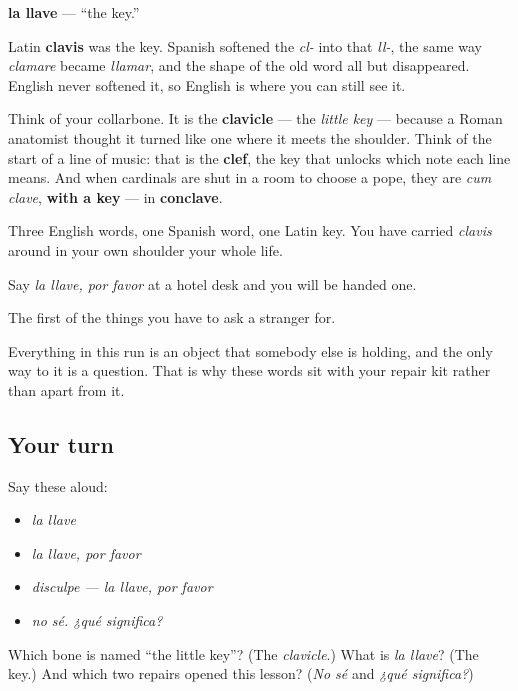 \begin{cousinweb}
\textbf{la llave} — \textquotedblleft{}the key.\textquotedblright{}

Latin \textbf{clavis} was the key. Spanish softened the \emph{cl-} into that \emph{ll-}, the same way \emph{clamare} became \emph{llamar}, and the shape of the old word all but disappeared. English never softened it, so English is where you can still see it.

Think of your collarbone. It is the \textbf{clavicle} — the \emph{little key} — because a Roman anatomist thought it turned like one where it meets the shoulder. Think of the start of a line of music: that is the \textbf{clef}, the key that unlocks which note each line means. And when cardinals are shut in a room to choose a pope, they are \emph{cum clave}, \textbf{with a key} — in \textbf{conclave}.

Three English words, one Spanish word, one Latin key. You have carried \emph{clavis} around in your own shoulder your whole life.

Say \emph{la llave, por favor} at a hotel desk and you will be handed one.
\end{cousinweb}

\begin{grammarlens}[title={What you've built}]
The first of the things you have to ask a stranger for.

Everything in this run is an object that somebody else is holding, and the only way to it is a question. That is why these words sit with your repair kit rather than apart from it.
\end{grammarlens}

\subsection*{Your turn}
Say these aloud:

\begin{itemize}
\raggedright
  \item \emph{la llave}
  \item \emph{la llave, por favor}
  \item \emph{disculpe — la llave, por favor}
  \item \emph{no sé. ¿qué significa?}
\end{itemize}

\begin{tcolorbox}[breakable,colback=teal!4,colframe=teal!35!black,title={Before you move on}]
Which bone is named \textquotedblleft{}the little key\textquotedblright{}? (The \emph{clavicle}.) What is \emph{la llave}? (The key.) And which two repairs opened this lesson? (\emph{No sé} and \emph{¿qué significa?})
\end{tcolorbox}
